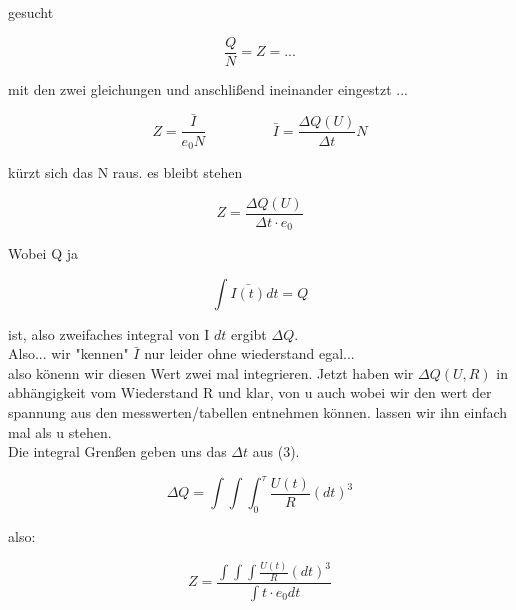 gesucht

\begin{equation}
\frac{Q}{N} = Z = ...
\end{equation}
 
mit den zwei gleichungen und anschlißend ineinander eingestzt ...

\begin{equation}
Z =  \frac{\bar{\si{I}}}{e_0N} \hspace{2cm} \bar{\si{I}}= \frac{\Delta Q(U)}{ \Delta t} N
\end{equation}

kürzt sich das N raus. es bleibt stehen 

\begin{equation}
Z= \frac{\Delta Q(U)}{\Delta t \cdot e_0}
\end{equation}

Wobei Q ja 

\begin{equation}
\int {\bar{I(t)}} dt = Q
\end{equation}

ist, also zweifaches integral von I $dt$ ergibt $\Delta Q$. \\
Also...  wir "kennen" $\bar{I}$ nur leider ohne wiederstand egal...\\
also könenn wir diesen Wert zwei mal integrieren. Jetzt haben wir $\Delta Q(U,R)$ in abhängigkeit vom Wiederstand R und klar, von u auch wobei wir den wert der spannung aus den messwerten/tabellen entnehmen können. lassen wir ihn einfach mal als u stehen.\\
Die integral Grenßen geben uns das $\Delta t$ aus (3). 


\begin{equation}
\Delta Q = \int{\int {\int_{0}^{\tau} \frac{U(t)}{R} (dt)^3}}
\end{equation}

also:

\begin{equation}
Z= \frac{\int{\int {\int \frac{U(t)}{R} (dt)^3}}}{\int t \cdot e_0 dt}
\end{equation}